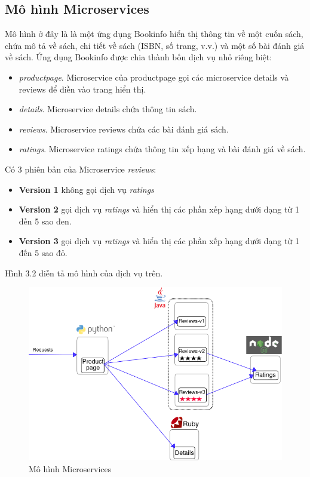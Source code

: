 \documentclass[14pt,a4paper]{book}
\begin{document}
{{	\subsection{Mô hình Microservices}
	Mô hình ở đây là là một ứng dụng Bookinfo hiển thị thông tin về một cuốn sách, chứa mô tả về sách, chi tiết về sách (ISBN, số trang, v.v.) và một số bài đánh giá về sách.
	Ứng dụng Bookinfo được chia thành bốn dịch vụ nhỏ riêng biệt:
	\begin{itemize}
		\item \textit{productpage}. Microservice của productpage gọi các microservice details và reviews để điền vào trang hiển thị.
		\item \textit{details}.  Microservice details chứa thông tin sách.
		\item \textit{reviews}. Microservice reviews chứa các bài đánh giá sách.
		\item \textit{ratings}. Microservice ratings chứa thông tin xếp hạng và bài đánh giá về sách.
	\end{itemize}
	
	Có 3 phiên bản của Microservice \textit{reviews}:
	\begin{itemize}
		\item \textbf{Version 1} không gọi dịch vụ \textit{ratings}
		\item \textbf{Version 2} gọi dịch vụ \textit{ratings} và hiển thị các phần xếp hạng dưới dạng từ 1 đến 5 sao đen.
		\item \textbf{Version 3} gọi dịch vụ \textit{ratings} và hiển thị các phần xếp hạng dưới dạng từ 1 đến 5 sao đỏ.
	\end{itemize}
	
	Hình 3.2 diễn tả mô hình của dịch vụ trên.
	\begin{figure}[h]
		\centering
		\includegraphics[width=0.7\linewidth]{Pics/3.1.2-1}
		\caption{Mô hình Microservices}
		\label{fig:3.1.2-1}
	\end{figure}
}}
\end{document}
